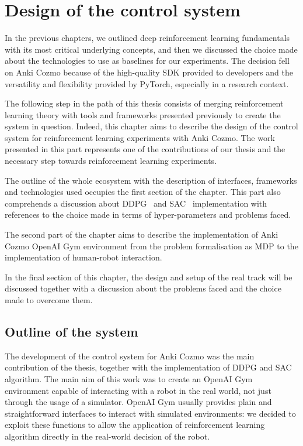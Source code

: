 \chapter{Design of the control system}\label{ch:ch4}

In the previous chapters, we outlined deep reinforcement learning fundamentals with its most critical underlying concepts, and then we discussed the choice made about the technologies to use as baselines for our experiments.
The decision fell on Anki Cozmo because of the high-quality SDK provided to developers and the versatility and flexibility provided by PyTorch, especially in a research context.

The following step in the path of this thesis consists of merging reinforcement learning theory with tools and frameworks presented previously to create the system in question.
Indeed, this chapter aims to describe the design of the control system for reinforcement learning experiments with Anki Cozmo.
The work presented in this part represents one of the contributions of our thesis and the necessary step towards reinforcement learning experiments.

The outline of the whole ecosystem with the description of interfaces, frameworks and technologies used occupies the first section of the chapter.
This part also comprehends a discussion about DDPG~\cite{lillicrap2015continuous} and SAC~\cite{haarnoja2018soft, haarnoja2018alg} implementation with references to the choice made in terms of hyper-parameters and problems faced.

The second part of the chapter aims to describe the implementation of Anki Cozmo OpenAI Gym environment from the problem formalisation as MDP to the implementation of human-robot interaction.

In the final section of this chapter, the design and setup of the real track will be discussed together with a discussion about the problems faced and the choice made to overcome them.

\section{Outline of the system}\label{sec:outline-of-the-system}

The development of the control system for Anki Cozmo was the main contribution of the thesis, together with the implementation of DDPG and SAC algorithm.
The main aim of this work was to create an OpenAI Gym environment capable of interacting with a robot in the real world, not just through the usage of a simulator.
OpenAI Gym usually provides plain and straightforward interfaces to interact with simulated environments: we decided to exploit these functions to allow the application of reinforcement learning algorithm directly in the real-world decision of the robot.

